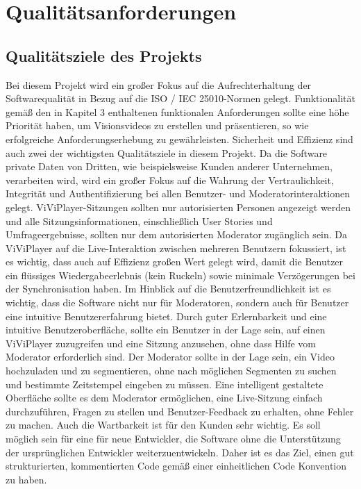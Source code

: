 \section{Qualitätsanforderungen}

	\subsection{Qualitätsziele des Projekts}
	
	Bei diesem Projekt wird ein großer Fokus auf die Aufrechterhaltung der Softwarequalität in Bezug auf die ISO / IEC 25010-Normen gelegt. 
    \linebreak
    Funktionalität gemäß den in Kapitel 3 enthaltenen funktionalen Anforderungen sollte eine höhe Priorität haben, um Visionsvideos zu erstellen und präsentieren, so wie erfolgreiche Anforderungserhebung zu gewährleisten.
    \linebreak
    Sicherheit und Effizienz sind auch zwei der wichtigsten Qualitätsziele in diesem Projekt. Da die Software private Daten von Dritten, wie beispielsweise Kunden anderer Unternehmen, verarbeiten wird, wird ein großer Fokus auf die Wahrung der Vertraulichkeit, Integrität und Authentifizierung bei allen Benutzer- und Moderatorinteraktionen gelegt. ViViPlayer-Sitzungen sollten nur autorisierten Personen angezeigt werden und alle Sitzungsinformationen, einschließlich User Stories und Umfrageergebnisse, sollten nur dem autorisierten Moderator zugänglich sein. 
    \linebreak
    Da ViViPlayer auf die Live-Interaktion zwischen mehreren Benutzern fokussiert, ist es wichtig, dass auch auf Effizienz großen Wert gelegt wird, damit die Benutzer ein flüssiges Wiedergabeerlebnis (kein Ruckeln) sowie minimale Verzögerungen bei der Synchronisation haben.
    \linebreak
    Im Hinblick auf die Benutzerfreundlichkeit ist es wichtig, dass die Software nicht nur für Moderatoren, sondern auch für Benutzer eine intuitive Benutzererfahrung bietet.  Durch guter Erlernbarkeit und eine intuitive Benutzeroberfläche, sollte ein Benutzer in der Lage sein, auf einen ViViPlayer zuzugreifen und eine Sitzung anzusehen, ohne dass Hilfe vom Moderator erforderlich sind.  Der Moderator sollte in der Lage sein, ein Video hochzuladen und zu segmentieren, ohne nach möglichen Segmenten zu suchen und bestimmte Zeitstempel eingeben zu müssen. Eine intelligent gestaltete Oberfläche sollte es dem Moderator ermöglichen, eine Live-Sitzung einfach durchzuführen,  Fragen zu stellen und Benutzer-Feedback zu erhalten, ohne Fehler zu machen.
    \linebreak
    \linebreak
    Auch die Wartbarkeit ist für den Kunden sehr wichtig. Es soll möglich sein für eine für neue Entwickler, die Software ohne die Unterstützung der ursprünglichen Entwickler weiterzuentwickeln. Daher ist
    es das Ziel, einen gut strukturierten, kommentierten Code gemäß einer einheitlichen Code Konvention zu haben.
    \linebreak
	
